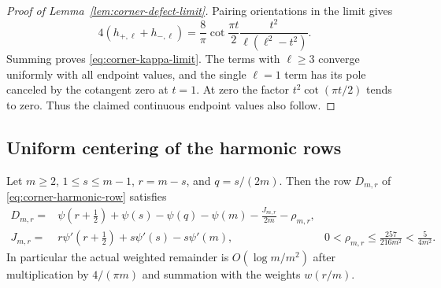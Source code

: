 \begin{proof}[Proof of Lemma~\ref{lem:corner-defect-limit}]
Pairing orientations in the limit gives
\[
 4(h_{+,\ell}+h_{-,\ell})
 =\frac8\pi\cot\frac{\pi t}{2}
       \frac{t^2}{\ell(\ell^2-t^2)}.
\]
Summing proves \eqref{eq:corner-kappa-limit}.  The terms with
$\ell\geq3$ converge uniformly with all endpoint values, and the
single $\ell=1$ term has its pole canceled by the cotangent zero
at $t=1$.  At zero the factor $t^2\cot(\pi t/2)$ tends to zero.
Thus the claimed continuous endpoint values also follow.
\end{proof}

\subsection{Uniform centering of the harmonic rows}
\label{sec:asym-details-centering}

\begin{lemma}
\label{lem:asym-details-centering}
Let $m\geq2$, $1\leq s\leq m-1$, $r=m-s$, and $q=s/(2m)$.
Then the row $D_{m,r}$ of \eqref{eq:corner-harmonic-row} satisfies
\begin{align}
 D_{m,r}={}&\psi(r+\tfrac12)+\psi(s)-\psi(q)-\psi(m)
                       -\frac{J_{m,r}}{2m}-\rho_{m,r},
 \label{eq:asym-details-centering-exact}\\
 J_{m,r}={}&r\psi'(r+\tfrac12)+s\psi'(s)-s\psi'(m),
 &0<\rho_{m,r}\leq\frac{257}{216m^2}<\frac5{4m^2}.
 \label{eq:asym-details-centering-error}
\end{align}
In particular the actual weighted remainder is
$O(\log m/m^2)$ after multiplication by $4/(\pi m)$ and
summation with the weights $w(r/m)$.
\end{lemma}

